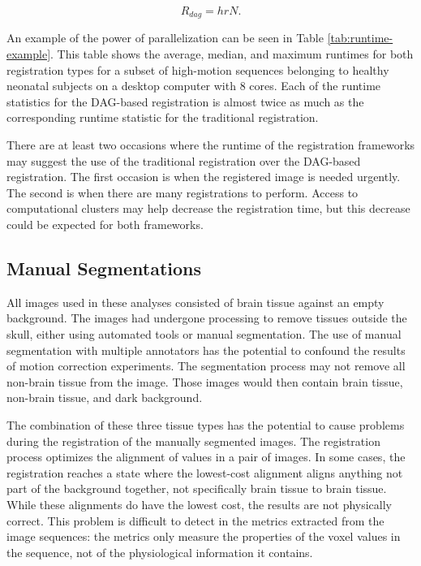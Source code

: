 \begin{equation}
R_{dag} = hrN.
\end{equation}

An example of the power of parallelization can be seen in Table \ref{tab:runtime-example}. This table shows the average, median, and maximum runtimes for both registration types for a subset of high-motion sequences belonging to healthy neonatal subjects on a desktop computer with 8 cores. Each of the runtime statistics for the DAG-based registration is almost twice as much as the corresponding runtime statistic for the traditional registration.

There are at least two occasions where the runtime of the registration frameworks may suggest the use of the traditional registration over the DAG-based registration. The first occasion is when the registered image is needed urgently. The second is when there are many registrations to perform. Access to computational clusters may help decrease the registration time, but this decrease could be expected for both frameworks.

\subsection{Manual Segmentations}

All images used in these analyses consisted of brain tissue against an empty background. The images had undergone processing to remove tissues outside the skull, either using automated tools or manual segmentation. The use of manual segmentation with multiple annotators has the potential to confound the results of motion correction experiments. The segmentation process may not remove all non-brain tissue from the image. Those images would then contain brain tissue, non-brain tissue, and dark background. 

The combination of these three tissue types has the potential to cause problems during the registration of the manually segmented images. The registration process optimizes the alignment of values in a pair of images. In some cases, the registration reaches a state where the lowest-cost alignment aligns anything not part of the background together, not specifically brain tissue to brain tissue. While these alignments do have the lowest cost, the results are not physically correct. This problem is difficult to detect in the metrics extracted from the image sequences: the metrics only measure the properties of the voxel values in the sequence, not of the physiological information it contains. 

